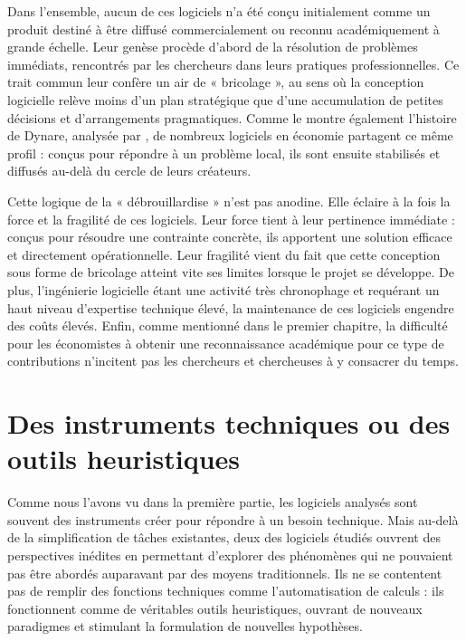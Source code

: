 Dans l’ensemble, aucun de ces logiciels n’a été conçu initialement comme un produit destiné à être diffusé commercialement ou reconnu académiquement à grande échelle. Leur genèse procède d’abord de la résolution de problèmes immédiats, rencontrés par les chercheurs dans leurs pratiques professionnelles. Ce trait commun leur confère un air de « bricolage », au sens où la conception logicielle relève moins d’un plan stratégique que d’une accumulation de petites décisions et d’arrangements pragmatiques. Comme le montre également l’histoire de Dynare, analysée par \cite{cherrierWriteYourModel2023}, de nombreux logiciels en économie partagent ce même profil : conçus pour répondre à un problème local, ils sont ensuite stabilisés et diffusés au-delà du cercle de leurs créateurs.

Cette logique de la « débrouillardise » n’est pas anodine. Elle éclaire à la fois la force et la fragilité de ces logiciels. Leur force tient à leur pertinence immédiate : conçus pour résoudre une contrainte concrète, ils apportent une solution efficace et directement opérationnelle. Leur fragilité vient du fait que cette conception sous forme de bricolage atteint vite ses limites lorsque le projet se développe. De plus, l'ingénierie logicielle étant une activité très chronophage et requérant un haut niveau d'expertise technique élevé, la maintenance de ces logiciels engendre des coûts élevés. Enfin, comme mentionné dans le premier chapitre, la difficulté pour les économistes à obtenir une reconnaissance académique pour ce type de contributions n'incitent pas les chercheurs et chercheuses à y consacrer du temps.





\section{Des instruments techniques ou des outils heuristiques}

Comme nous l'avons vu dans la première partie, les logiciels analysés sont souvent des instruments créer pour répondre à un besoin technique. Mais au-delà de la simplification de tâches existantes, deux des logiciels étudiés ouvrent des perspectives inédites en permettant d’explorer des phénomènes qui ne pouvaient pas être abordés auparavant par des moyens traditionnels. Ils ne se contentent pas de remplir des fonctions techniques comme l'automatisation de calculs : ils fonctionnent comme de véritables outils heuristiques, ouvrant de nouveaux paradigmes et stimulant la formulation de nouvelles hypothèses.

